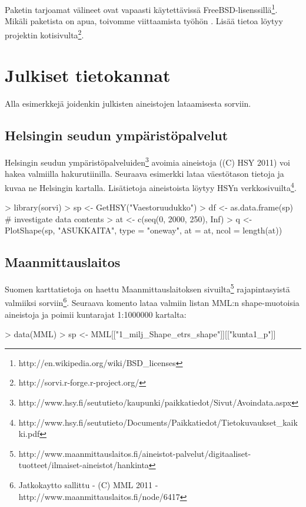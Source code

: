 \documentclass[a4paper,finnish]{article}
\begin{document}
Paketin tarjoamat välineet ovat vapaasti käytettävissä
FreeBSD-lisenssillä\footnote{http://en.wikipedia.org/wiki/BSD\_licenses}. Mikäli
paketista on apua, toivomme viittaamista työhön \cite{sorvi11}. Lisää tietoa löytyy projektin kotisivulta\footnote{http://sorvi.r-forge.r-project.org/}.

\section{Julkiset tietokannat}

Alla esimerkkejä joidenkin julkisten aineistojen lataamisesta sorviin.

\subsection{Helsingin seudun ympäristöpalvelut}

Helsingin seudun
ympäristöpalveluiden\footnote{http://www.hsy.fi/seututieto/kaupunki/paikkatiedot/Sivut/Avoindata.aspx}
avoimia aineistoja ((C) HSY 2011) voi hakea valmiilla
hakurutiinilla. Seuraava esimerkki lataa väestötason tietoja ja kuvaa
ne Helsingin kartalla. Lisätietoja aineistoista löytyy HSYn
verkkosivuilta\footnote{http://www.hsy.fi/seututieto/Documents/Paikkatiedot/Tietokuvaukset\_kaikki.pdf}. 

\begin{Schunk}
\begin{Sinput}
> library(sorvi)
> sp <- GetHSY("Vaestoruudukko")
> df <- as.data.frame(sp) # investigate data contents
> at <-  c(seq(0, 2000, 250), Inf) 
> q <- PlotShape(sp, "ASUKKAITA", type = "oneway", at = at, ncol = length(at))
\end{Sinput}
\end{Schunk}

\subsection{Maanmittauslaitos}

Suomen karttatietoja on haettu Maanmittauslaitoksen
sivuilta\footnote{http://www.maanmittauslaitos.fi/aineistot-palvelut/digitaaliset-tuotteet/ilmaiset-aineistot/hankinta}
rajapintasyistä valmiiksi sorviin\footnote{Jatkokaytto sallittu - (C) MML 2011 - http://www.maanmittauslaitos.fi/node/6417}. Seuraava komento lataa valmiin listan MML:n shape-muotoisia aineistoja ja poimii kuntarajat 1:1000000 kartalta:

\begin{Schunk}
\begin{Sinput}
> data(MML)
> sp <- MML[["1_milj_Shape_etrs_shape"]][["kunta1_p"]]
\end{Sinput}
\end{Schunk}
\end{document}
